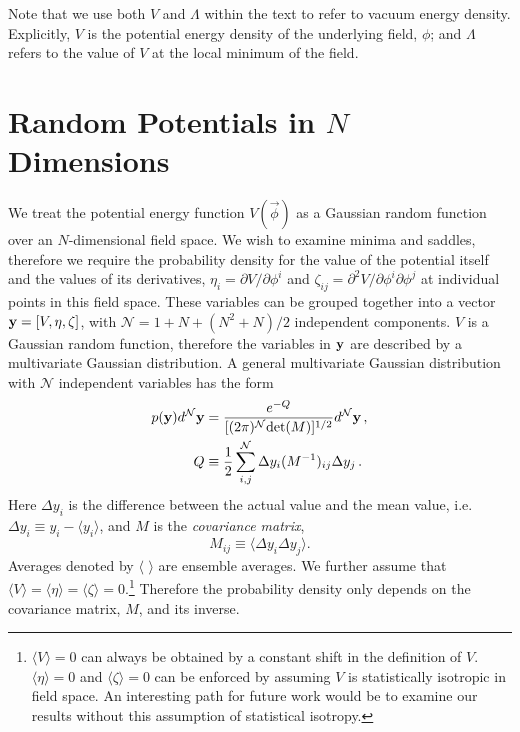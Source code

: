 \documentclass[12pt]{article}
\begin{document}
Note that we use both $V$ and $\Lambda$ within the text to refer to vacuum energy density. Explicitly, $V$ is the potential energy density of the underlying field, $\phi$; and $\Lambda$ refers to the value of $V$ at the local minimum of the field.
 
 
\section{Random Potentials in $N$ Dimensions}

We treat the potential energy function $V({\vec{\phi}})$ as a Gaussian random function over an $N$-dimensional field space. We wish to examine minima and saddles, therefore we require the probability density for the value of the potential itself and the values of its derivatives, $\eta_i = \partial V/\partial \phi^i$ and $\zeta_{ij}=\partial^2 V/\partial \phi^i\partial \phi^j$ at individual points in this field space. These variables can be grouped together into a vector ${\bf y} = [V,\eta,\zeta]$, with $\mathcal{N}=1+N+(N^2+N)/2$ independent components. $V$ is a Gaussian random function, therefore the variables in ${\bf y}$ are described by a multivariate Gaussian distribution. A general multivariate Gaussian distribution with $\mathcal{N}$ independent variables has the form
\begin{equation} \label{MultivariateGaussian}
\begin{split}
p({\bf y})d^\mathcal{N}{\bf y} &= \frac{e^{-Q}}{[(2\pi)^\mathcal{N} \mathrm{det}(M)]^{1/2}} d^\mathcal{N}{\bf y} \, ,\\
Q &\equiv \frac{1}{2} \sum_{i,j}^\mathcal{N} \Delta y_i (M^{-1})_{ij} \Delta y_{j} \, .\\
\end{split}
\end{equation}
%
Here $\Delta y_i$ is the difference between the actual value and the mean value, i.e. $\Delta y_i \equiv y_i - \langle y_i \rangle$, and $M$ is the \emph{covariance matrix}, 
%
\begin{equation}
M_{ij} \equiv \langle \Delta y_i \Delta y_j \rangle.
\end{equation}
%
Averages denoted by $\langle \,\,\rangle$ are ensemble averages. We further assume that $\langle V\rangle = \langle \eta\rangle = \langle \zeta\rangle = 0$.\footnote{$\langle V\rangle=0$ can always be obtained by a constant shift in the definition of $V$. $\langle \eta \rangle = 0$ and $\langle \zeta\rangle = 0$ can be enforced by assuming $V$ is statistically isotropic in field space. An interesting path for future work would be to examine our results without this assumption of statistical isotropy.} Therefore the probability density only depends on the covariance matrix, $M$, and its inverse.
\end{document}
